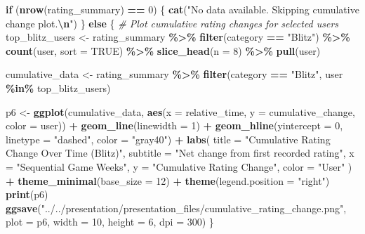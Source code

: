\documentclass[
]{article}
\newenvironment{Shaded}{\begin{snugshade}}{\end{snugshade}}
\newcommand{\AttributeTok}[1]{\textcolor[rgb]{0.13,0.29,0.53}{#1}}
\newcommand{\CommentTok}[1]{\textcolor[rgb]{0.56,0.35,0.01}{\textit{#1}}}
\newcommand{\ConstantTok}[1]{\textcolor[rgb]{0.56,0.35,0.01}{#1}}
\newcommand{\ControlFlowTok}[1]{\textcolor[rgb]{0.13,0.29,0.53}{\textbf{#1}}}
\newcommand{\DecValTok}[1]{\textcolor[rgb]{0.00,0.00,0.81}{#1}}
\newcommand{\FunctionTok}[1]{\textcolor[rgb]{0.13,0.29,0.53}{\textbf{#1}}}
\newcommand{\NormalTok}[1]{#1}
\newcommand{\OtherTok}[1]{\textcolor[rgb]{0.56,0.35,0.01}{#1}}
\newcommand{\SpecialCharTok}[1]{\textcolor[rgb]{0.81,0.36,0.00}{\textbf{#1}}}
\newcommand{\StringTok}[1]{\textcolor[rgb]{0.31,0.60,0.02}{#1}}
\begin{document}
\begin{Shaded}
\begin{Highlighting}[]
\ControlFlowTok{if}\NormalTok{ (}\FunctionTok{nrow}\NormalTok{(rating\_summary) }\SpecialCharTok{==} \DecValTok{0}\NormalTok{) \{}
    \FunctionTok{cat}\NormalTok{(}\StringTok{"No data available. Skipping cumulative change plot.}\SpecialCharTok{\textbackslash{}n}\StringTok{"}\NormalTok{)}
\NormalTok{\} }\ControlFlowTok{else}\NormalTok{ \{}
    \CommentTok{\# Plot cumulative rating changes for selected users}
\NormalTok{    top\_blitz\_users }\OtherTok{\textless{}{-}}\NormalTok{ rating\_summary }\SpecialCharTok{\%\textgreater{}\%}
        \FunctionTok{filter}\NormalTok{(category }\SpecialCharTok{==} \StringTok{"Blitz"}\NormalTok{) }\SpecialCharTok{\%\textgreater{}\%}
        \FunctionTok{count}\NormalTok{(user, }\AttributeTok{sort =} \ConstantTok{TRUE}\NormalTok{) }\SpecialCharTok{\%\textgreater{}\%}
        \FunctionTok{slice\_head}\NormalTok{(}\AttributeTok{n =} \DecValTok{8}\NormalTok{) }\SpecialCharTok{\%\textgreater{}\%}
        \FunctionTok{pull}\NormalTok{(user)}

\NormalTok{    cumulative\_data }\OtherTok{\textless{}{-}}\NormalTok{ rating\_summary }\SpecialCharTok{\%\textgreater{}\%}
        \FunctionTok{filter}\NormalTok{(category }\SpecialCharTok{==} \StringTok{"Blitz"}\NormalTok{, user }\SpecialCharTok{\%in\%}\NormalTok{ top\_blitz\_users)}

\NormalTok{    p6 }\OtherTok{\textless{}{-}} \FunctionTok{ggplot}\NormalTok{(cumulative\_data, }\FunctionTok{aes}\NormalTok{(}\AttributeTok{x =}\NormalTok{ relative\_time, }\AttributeTok{y =}\NormalTok{ cumulative\_change, }\AttributeTok{color =}\NormalTok{ user)) }\SpecialCharTok{+}
        \FunctionTok{geom\_line}\NormalTok{(}\AttributeTok{linewidth =} \DecValTok{1}\NormalTok{) }\SpecialCharTok{+}
        \FunctionTok{geom\_hline}\NormalTok{(}\AttributeTok{yintercept =} \DecValTok{0}\NormalTok{, }\AttributeTok{linetype =} \StringTok{"dashed"}\NormalTok{, }\AttributeTok{color =} \StringTok{"gray40"}\NormalTok{) }\SpecialCharTok{+}
        \FunctionTok{labs}\NormalTok{(}
            \AttributeTok{title =} \StringTok{"Cumulative Rating Change Over Time (Blitz)"}\NormalTok{,}
            \AttributeTok{subtitle =} \StringTok{"Net change from first recorded rating"}\NormalTok{,}
            \AttributeTok{x =} \StringTok{"Sequential Game Weeks"}\NormalTok{,}
            \AttributeTok{y =} \StringTok{"Cumulative Rating Change"}\NormalTok{,}
            \AttributeTok{color =} \StringTok{"User"}
\NormalTok{        ) }\SpecialCharTok{+}
        \FunctionTok{theme\_minimal}\NormalTok{(}\AttributeTok{base\_size =} \DecValTok{12}\NormalTok{) }\SpecialCharTok{+}
        \FunctionTok{theme}\NormalTok{(}\AttributeTok{legend.position =} \StringTok{"right"}\NormalTok{)}
    \FunctionTok{print}\NormalTok{(p6)}
    \FunctionTok{ggsave}\NormalTok{(}\StringTok{"../../presentation/presentation\_files/cumulative\_rating\_change.png"}\NormalTok{, }\AttributeTok{plot =}\NormalTok{ p6, }\AttributeTok{width =} \DecValTok{10}\NormalTok{, }\AttributeTok{height =} \DecValTok{6}\NormalTok{, }\AttributeTok{dpi =} \DecValTok{300}\NormalTok{)}
\NormalTok{\}}
\end{Highlighting}
\end{Shaded}
\end{document}
